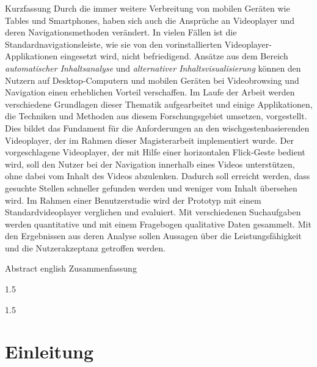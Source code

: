 \documentclass[11pt,a4paper]{report}
\begin{document}
\setcounter{page}{5}
\begin{preface}{Kurzfassung}
Durch die immer weitere Verbreitung von mobilen Geräten wie Tables und Smartphones, haben sich auch die Ansprüche an Videoplayer und deren Navigationsmethoden verändert. In vielen Fällen ist die Standardnavigationsleiste, wie sie von den vorinstallierten Videoplayer-Applikationen eingesetzt wird, nicht befriedigend. Ansätze aus dem Bereich \textit{automatischer Inhaltsanalyse} und \textit{alternativer Inhaltsvisualisierung} können den Nutzern auf Desktop-Computern und mobilen Geräten bei Videobrowsing und Navigation einen erheblichen Vorteil verschaffen. Im Laufe der Arbeit werden verschiedene Grundlagen dieser Thematik aufgearbeitet und einige Applikationen, die Techniken und Methoden aus diesem Forschungsgebiet umsetzen, vorgestellt. Dies bildet das Fundament für die Anforderungen an den wischgestenbasierenden Videoplayer, der im Rahmen dieser Magisterarbeit implementiert wurde. Der vorgeschlagene Videoplayer, der mit Hilfe einer horizontalen Flick-Geste bedient wird, soll den Nutzer bei der Navigation innerhalb eines Videos unterstützen, ohne dabei vom Inhalt des Videos abzulenken. Dadurch soll erreicht werden, dass gesuchte Stellen schneller gefunden werden und weniger vom Inhalt übersehen wird. Im Rahmen einer Benutzerstudie wird der Prototyp mit einem Standardvideoplayer verglichen und evaluiert. Mit verschiedenen Suchaufgaben werden quantitative und mit einem Fragebogen qualitative Daten gesammelt. Mit den Ergebnissen aus deren Analyse sollen Aussagen über die Leistungsfähigkeit und die Nutzerakzeptanz getroffen werden.
\end{preface}

\setcounter{page}{6}
\begin{preface}{Abstract}
 english Zusammenfassung
\end{preface}



\setcounter{page}{7}
{
	\setlength{\baselineskip}%
			{1.5\baselineskip}
	\afterpreface
}

{
	\setlength{\baselineskip}%
			{1.5\baselineskip}
	\listoffigures
	\clearemptydoublepage
	\clearemptydoublepage
}



\chapter{Einleitung}
\end{document}
